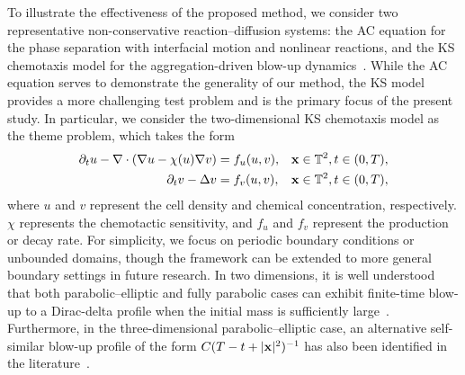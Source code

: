 \documentclass[a4paper,fleqn]{cas-sc}
\theoremstyle{definition}
\theoremstyle{remark}
\begin{document}
To illustrate the effectiveness of the proposed method, we consider two representative non-conservative reaction–diffusion systems: the AC equation for the phase separation with interfacial motion and nonlinear reactions,  
and the KS chemotaxis model for the aggregation-driven blow-up dynamics~\cite{keller1970initiation, patlak1953random}. 
While the AC equation serves to demonstrate the generality of our method, the KS model provides a more challenging test problem and is the primary focus of the present study. In particular, we consider the two-dimensional KS chemotaxis model as the theme problem, which takes the form 
\begin{equation}\label{equ:KS}
\begin{aligned}
\partial_t u - \nabla \cdot ( \nabla u - \chi(u) \nabla v) &= f_u(u,v), & \mathbf{x}\in \mathbb{T}^2 , t\in(0,T), \\
\partial_t v - \Delta v &= f_v(u,v), & \mathbf{x}\in \mathbb{T}^2 , t\in(0,T),
\end{aligned}
\end{equation}
where $u$ and $v$ represent the cell density and chemical concentration, respectively. $\chi$ represents the chemotactic sensitivity, and $f_u$ and $f_v$ represent the production or decay rate.  For simplicity, we focus on periodic boundary conditions or unbounded domains, though the framework can be extended to more general boundary settings in future research.  
In two dimensions, it is well understood that both parabolic–elliptic and fully parabolic cases can exhibit finite-time blow-up to a Dirac-delta profile when the initial mass is sufficiently large~\cite{herrero1997blow, perthame2007transport}. Furthermore, in the three-dimensional parabolic–elliptic case, an alternative self-similar blow-up profile of the form $ C(T-t+\vert \mathbf x\vert ^2)^{-1}$ has also been identified in the literature~\cite{giga2011asymptotic,souplet2019blow}. 
\end{document}
